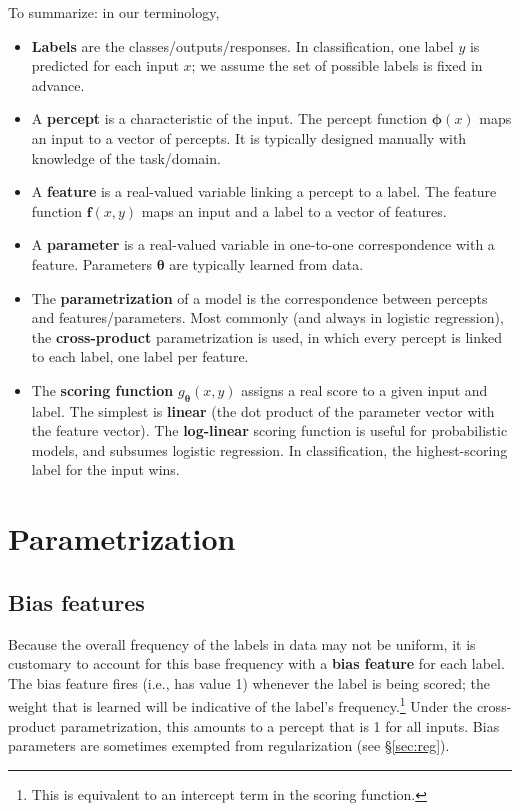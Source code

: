 \documentclass[11pt,letterpaper]{article}
\newcommand{\Sref}[1]{\S\ref{#1}}
\begin{document}
\noindent To summarize: in our terminology,
\begin{itemize}
  \item {\bf Labels} are the classes/outputs/responses. In classification, one label $y$ is predicted for each input $x$; 
  we assume the set of possible labels is fixed in advance.
  \item A {\bf percept} is a characteristic of the input. The percept function $\boldsymbol{\phi}(x)$ maps an input to a vector of percepts.
  It is typically designed manually with knowledge of the task/domain.
  \item A {\bf feature} is a real-valued variable linking a percept to a label. The feature function $\mathbf{f}(x,y)$ maps an input and a label to a vector of features.
  \item A {\bf parameter} is a real-valued variable in one-to-one correspondence with a feature. Parameters $\boldsymbol{\theta}$ are typically learned from data.
  \item The {\bf parametrization} of a model is the correspondence between percepts and features/parameters. 
  Most commonly (and always in logistic regression), the {\bf cross-product} parametrization is used, in which every percept is linked to each label, one label per feature.
  \item The {\bf scoring function} $g_{\boldsymbol{\theta}}(x,y)$ assigns a real score to a given input and label. 
  The simplest is {\bf linear} (the dot product of the parameter vector with the feature vector).
  The {\bf log-linear} scoring function is useful for probabilistic models, and subsumes logistic regression.
  In classification, the highest-scoring label for the input wins. 
\end{itemize}

\section{Parametrization}

\subsection{Bias features}\label{sec:bias}

Because the overall frequency of the labels in data may not be uniform, 
it is customary to account for this base frequency with a {\bf bias feature} 
for each label. The bias feature fires (i.e., has value 1) whenever 
the label is being scored; the weight that is learned will be indicative of 
the label's frequency.\footnote{This is equivalent to an intercept term in the scoring function.} 
Under the cross-product parametrization, this amounts to a percept that is 1 for all inputs.
Bias parameters are sometimes exempted from regularization (see \Sref{sec:reg}).
\end{document}
